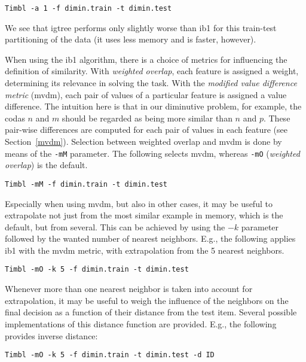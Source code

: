 \documentclass{report}
\begin{document}
{\small
\begin{verbatim}
Timbl -a 1 -f dimin.train -t dimin.test
\end{verbatim}} 

We see that {\sc igtree} performs only slightly worse than {\sc ib1}
for this train-test partitioning of the data (it uses less memory and
is faster, however). 

When using the {\sc ib1} algorithm, there is a choice of metrics for
influencing the definition of similarity. With {\em weighted overlap},
each feature is assigned a weight, determining its relevance in
solving the task. With the {\em modified value difference metric}
({\sc mvdm}), each pair of values of a particular feature is assigned
a value difference. The intuition here is that in our diminutive
problem, for example, the codas $n$ and $m$ should be regarded as
being more similar than $n$ and $p$. These pair-wise differences are
computed for each pair of values in each feature (see
Section~\ref{mvdm}). Selection between weighted overlap and {\sc mvdm}
is done by means of the {\tt -mM} parameter. The following selects {\sc
mvdm}, whereas {\tt -mO} ({\em weighted overlap}) is the default.

{\small
\begin{verbatim}
Timbl -mM -f dimin.train -t dimin.test
\end{verbatim}
}

Especially when using {\sc mvdm}, but also in other cases, it may be
useful to extrapolate not just from the most similar example in
memory, which is the default, but from several. This can be achieved
by using the $-k$ parameter followed by the wanted number of nearest
neighbors. E.g., the following applies {\sc ib1} with the {\sc mvdm}
metric, with extrapolation from the 5 nearest neighbors.

{\small
\begin{verbatim}
Timbl -mO -k 5 -f dimin.train -t dimin.test
\end{verbatim}
}

Whenever more than one nearest neighbor is taken into account for
extrapolation, it may be useful to weigh the influence of the
neighbors on the final decision as a function of their distance from
the test item. Several possible implementations of this distance
function are provided. E.g., the following provides inverse distance: 

{\small
\begin{verbatim}
Timbl -mO -k 5 -f dimin.train -t dimin.test -d ID
\end{verbatim}
}
\end{document}
